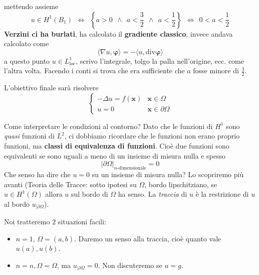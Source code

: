 \documentclass[10pt,a4paper,twoside,openright]{book}
\newcommand{\x}{\mathbf{x}}
\begin{document}
mettendo assieme
\begin{equation*}
	u\in H^{1}(B_{1}) \ \ \Leftrightarrow \ \ \left\{a >0\ \ \land \ \ a< \frac{3}{2} \ \ \land \ \ a< \frac{1}{2}\right\} \ \ \Leftrightarrow \ \ 0< a< \frac{1}{2}
\end{equation*}
\textbf{Verzini ci ha burlati}, ha calcolato il \textbf{gradiente classico}, invece andava calcolato come
\begin{equation*}
	\langle \nabla u,\bm{\varphi} \rangle =-\langle u,\mathrm{div}\bm{\varphi} \rangle 
\end{equation*}
a questo punto $u\in L^{1}_{\mathrm{loc}}$, scrivo l'integrale, tolgo la palla nell'origine, ecc. come l'altra volta. Facendo i conti si trova che era sufficiente che $a$ fosse minore di $\frac{3}{2}$.



L'obiettivo finale sarà risolvere
\begin{equation*}
	\begin{cases}
		-\Delta u=f(\x) & \x \in \Omega          \\
		u=0                     & \x \in \partial \Omega 
	\end{cases}
\end{equation*}
\begin{oss}
	Come interpretare le condizioni al contorno? Dato che le funzioni di $H^{1}$ sono \textit{quasi} funzioni di $L^{2}$, ci dobbiamo ricordare che le funzioni non erano proprio funzioni, ma \textbf{classi di equivalenza di funzioni}. Cioè due funzioni sono equivalenti se sono uguali a meno di un insieme di misura nulla e spesso
	\begin{equation*}
		| \partial \Omega | _{n\text{-dimensionale}} =0
	\end{equation*}
	Che senso ha dire che $u=0$ su un insieme di misura nulla? Lo scopriremo più avanti (Teoria delle Tracce: sotto ipotesi su $\Omega $, bordo lipschitziano, se $u\in H^{1}(\Omega)$ allora $u$ sul bordo di $\Omega $ ha senso. La \textit{traccia} di $u$ è la restrizione di $u$ al bordo $u_{|\partial \Omega }$).
\end{oss}
Noi tratteremo $2$ situazioni facili:
\begin{itemize}
	\item $n=1$, $\Omega =(a,b)$. Daremo un senso alla traccia, cioè quanto vale $u(a) ,u(b)$.
	\item $n=n,\Omega =\Omega $, ma $u_{|\partial \Omega } =0$. Non discuteremo se $u=g$.
\end{itemize}
\end{document}
